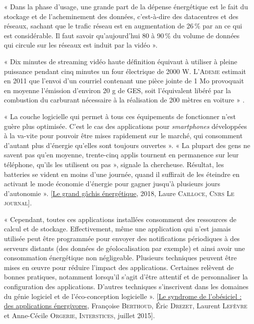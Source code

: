 
« Dans la phase d’usage, une grande part de la dépense énergétique est le fait du stockage et de l’acheminement des données, c’est-à-dire des datacentres et des réseaux, sachant que le trafic réseau est en augmentation de 26\,\% par an ce qui est considérable. Il faut savoir qu’aujourd’hui 80 à 90\,\% du volume de données qui circule sur les réseaux est induit par la vidéo ».

« Dix minutes de streaming vidéo haute définition équivaut à utiliser à pleine puissance pendant cinq minutes un four électrique de 2000 W. L’\textsc{Ademe} estimait en 2011 que l’envoi d’un courriel contenant une pièce jointe de 1 Mo provoquait en moyenne l’émission d’environ 20 g de GES, soit l’équivalent libéré par la combustion du carburant nécessaire à la réalisation de 200 mètres en voiture » \parencite{Marquet-et-al:2019}.


« La couche logicielle qui permet à tous ces équipements de fonctionner n’est guère plus optimisée. C’est le cas des applications pour \textit{smartphones} développées à la va-vite pour pouvoir être mises rapidement sur le marché, qui consomment d’autant plus d’énergie qu’elles sont toujours ouvertes ». « La plupart des gens ne savent pas qu’en moyenne, trente-cinq applis tournent en permanence sur leur téléphone, qu’ils les utilisent ou pas », signale la chercheuse. Résultat, les batteries se vident en moins d’une journée, quand il suffirait de les éteindre en activant le mode économie d’énergie pour gagner jusqu’à plusieurs jours d’autonomie ». [\href{https://lejournal.cnrs.fr/articles/numerique-le-grand-gachis-energetique}{Le grand gâchis énergétique}, 2018, Laure \textsc{Cailloce}, \textsc{Cnrs Le journal}].

%
« Cependant, toutes ces applications installées consomment des ressources de calcul et de stockage. Effectivement, même une application qui n’est jamais utilisée peut être programmée pour envoyer des notifications périodiques à des serveurs distants (des données de géolocalisation par exemple) et ainsi avoir une consommation énergétique non négligeable. Plusieurs techniques peuvent être mises en œuvre pour réduire l’impact des applications. Certaines relèvent de bonnes pratiques, notamment lorsqu’il s’agit d’être attentif et de personnaliser la configuration des applications. D’autres techniques s’inscrivent dans les domaines du génie logiciel et de l’éco-conception logicielle ». [\href{https://interstices.info/le-syndrome-de-lobesiciel-des-applications-energivores/}{Le syndrome de l’obésiciel : des applications énergivores}, Françoise \textsc{Berthoud}, Éric \textsc{Drezet}, Laurent \textsc{Lefèvre} et Anne-Cécile \textsc{Orgerie}, \textsc{Interstices}, juillet 2015].

